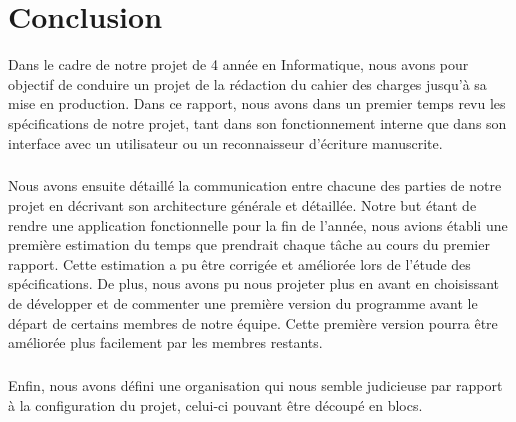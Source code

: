 \chapter{Conclusion}

Dans le cadre de notre projet de 4 année en Informatique, nous avons
pour objectif de conduire un projet de la rédaction du cahier des charges
jusqu’à sa mise en production. Dans ce rapport, nous avons dans un premier
temps revu les spécifications de notre projet, tant dans son fonctionnement
interne que dans son interface avec un utilisateur ou un reconnaisseur
d’écriture manuscrite.

\paragraph{}
Nous avons ensuite détaillé la communication entre chacune des parties de
notre projet en décrivant son architecture générale et détaillée. Notre but
étant de rendre une application fonctionnelle pour la fin de l’année, nous
avions établi une première estimation du temps que prendrait chaque tâche
au cours du premier rapport. Cette estimation a pu être corrigée et améliorée
lors de l’étude des spécifications. De plus, nous avons pu nous projeter plus
en avant en choisissant de développer et de commenter une première version du
programme avant le départ de certains membres de notre équipe. Cette première
version pourra être améliorée plus facilement par les membres restants.

\paragraph{}
Enfin, nous avons défini une organisation qui nous semble judicieuse par
rapport à la configuration du projet, celui-ci pouvant être découpé en blocs.
